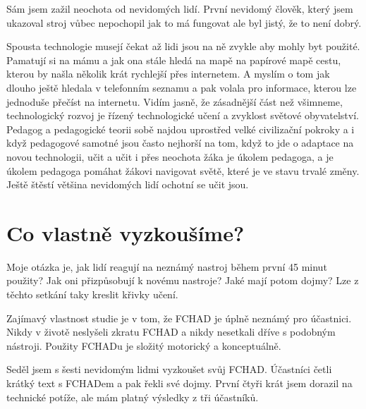 Sám jsem zažil neochota od nevidomých lidí. První nevidomý člověk, který jsem ukazoval stroj vůbec nepochopil jak to má fungovat ale byl jistý, že to není dobrý.

Spousta technologie musejí čekat až lidi jsou na ně zvykle aby mohly byt použité.  Pamatují si na mámu a jak ona stále hledá na mapě na papírové mapě cestu, kterou by našla několik krát rychlejší přes internetem.  A myslím o tom jak dlouho ještě hledala v telefonním seznamu a pak volala pro informace, kterou lze jednoduše přečíst na internetu.  Vidím jasně, že zásadnější část než všimneme, technologický rozvoj je řízený technologické učení a zvyklost světové obyvatelství.  Pedagog a pedagogické teorii sobě najdou uprostřed velké civilizační pokroky a i když pedagogové samotné jsou často nejhorší na tom, když to jde o adaptace na novou technologii, učit a učit i přes neochota žáka je úkolem pedagoga, a je úkolem pedagoga pomáhat žákovi navigovat světě, které je ve stavu trvalé změny.  Ještě štěstí většina nevidomých lidí ochotní se učit jsou.

\section{Co vlastně vyzkoušíme?}

Moje otázka je, jak lidí reagují na neznámý nastroj během první 45 minut použity?  Jak oni přizpůsobují k novému nastroje?  Jaké mají potom dojmy?  Lze z těchto setkání taky kreslit křivky učení.

Zajímavý vlastnost studie je v tom, že FCHAD je úplně neznámý pro účastnici.  Nikdy v životě neslyšeli zkratu FCHAD a nikdy nesetkali dříve s podobným nástroji.  Použity FCHADu je složitý motorický a konceptuálně.

Seděl jsem s šesti nevidomým lidmi vyzkoušet svůj FCHAD. Účastníci četli krátký text s FCHADem a pak řekli své dojmy.  První čtyři krát jsem dorazil na technické potíže, ale mám platný výsledky z tři účastníků.
